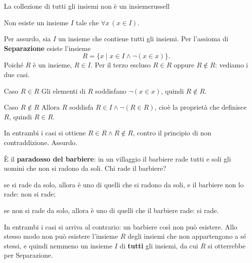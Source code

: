 \begin{concetto}
\begin{Teorema}{La collezione di tutti gli insiemi non è un insieme}{russell}
    \begin{prerequisiti}
    \end{prerequisiti}
    Non esiste un insieme $I$ tale che $\forall x\,(x \in I)$.
\end{Teorema}
\begin{dimostrazione}
    Per assurdo, sia $I$ un insieme che contiene tutti gli insiemi. Per l'assioma di \textbf{Separazione} esiste l'insieme
    \[ R = \{x \mid x \in I \wedge \neg(x \in x)\}. \]
    Poiché $R$ è un insieme, $R \in I$. Per il terzo escluso $R \in R$ oppure $R \notin R$: vediamo i due casi.
    \begin{caso}{Caso $R \in R$}
        Gli elementi di $R$ soddisfano $\neg(x \in x)$, quindi $R \notin R$.
    \end{caso}
    \begin{caso}{Caso $R \notin R$}
        Allora $R$ soddisfa $R \in I \wedge \neg(R \in R)$, cioè la proprietà che definisce $R$, quindi $R \in R$.
    \end{caso}
    In entrambi i casi si ottiene $R \in R \wedge R \notin R$, contro il principio di non contraddizione. Assurdo.
\end{dimostrazione}
\end{concetto}

\begin{spiegazione}
    È il \textbf{paradosso del barbiere}: in un villaggio il barbiere rade tutti e soli gli uomini che non si radono da soli. Chi rade il barbiere?
    \begin{passi}
        \item se si rade da solo, allora è uno di quelli che si radono da soli, e il barbiere non lo rade: non si rade;
        \item se non si rade da solo, allora è uno di quelli che il barbiere rade: si rade.
    \end{passi}
    In entrambi i casi si arriva al contrario: un barbiere così non può esistere. Allo stesso modo non può esistere l'insieme $R$ degli insiemi che
    non appartengono a sé stessi, e quindi nemmeno un insieme $I$ di \textbf{tutti} gli insiemi, da cui $R$ si otterrebbe per Separazione.
\end{spiegazione}


